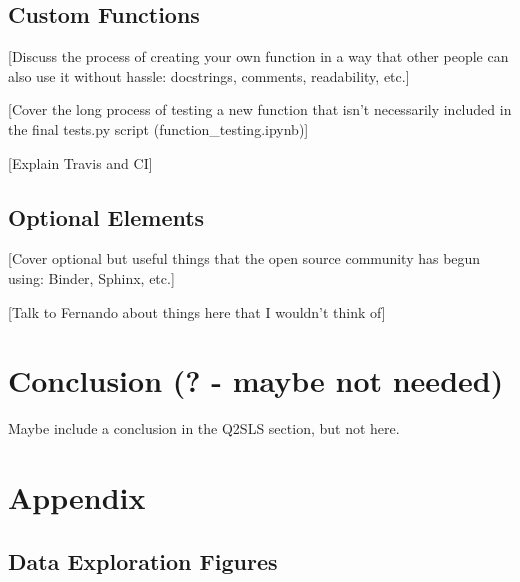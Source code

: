 \documentclass[12pt]{article}
\begin{document}
\subsection{Custom Functions}
\textcolor{BrickRed}{[Discuss the process of creating your own function in a way that other people can also use it without hassle: docstrings, comments, readability, etc.]}

\textcolor{BrickRed}{[Cover the long process of testing a new function that isn't necessarily included in the final tests.py script (function\_testing.ipynb)]}

\textcolor{BrickRed}{[Explain Travis and CI]}

\subsection{Optional Elements}
\textcolor{BrickRed}{[Cover optional but useful things that the open source community has begun using: Binder, Sphinx, etc.]}

\textcolor{BrickRed}{[Talk to Fernando about things here that I wouldn't think of]}


\newpage
\section{Conclusion (? - maybe not needed)}
Maybe include a conclusion in the Q2SLS section, but not here.

\newpage
\section{Appendix}

\subsection{Data Exploration Figures}
\end{document}
